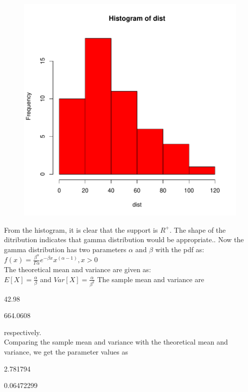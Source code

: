 \documentclass[12pt]{article}
\begin{document}
\begin{figure}[H]
\includegraphics{HW1-016}
\end{figure}

From the histogram, it is clear that the support is $R^{+}$. The shape of the ditribution indicates that gamma distribution would be appropriate.. Now the gamma distribution has two parameters $\alpha$ and $\beta$ with the pdf as:\\
$f(x)=\frac{\beta^{\alpha}}{\Gamma \alpha}e^{-\beta x}x^{(\alpha-1)}, x>0$\\
The theoretical mean and variance are given as:\\
$E[X]=\frac{\alpha}{\beta}$ and $Var[X]=\frac{\alpha}{\beta^2}$
The sample mean and variance are
\begin{Schunk}
\begin{Soutput}
[1] 42.98
\end{Soutput}
\begin{Soutput}
[1] 664.0608
\end{Soutput}
\end{Schunk}
respectively.\\
Comparing the sample mean and variance with the theoretical mean and variance, we get the parameter values as
\begin{Schunk}
\begin{Soutput}
[1] 2.781794
\end{Soutput}
\begin{Soutput}
[1] 0.06472299
\end{Soutput}
\end{Schunk}
\end{document}
